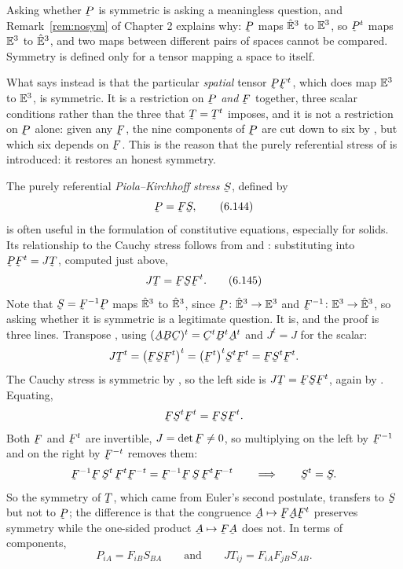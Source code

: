 \begin{remark}\label{rem:ch6Pnotsym}
Asking whether $\bP$ is symmetric is asking a meaningless question, and
Remark~\ref{rem:nosym} of Chapter 2 explains why: $\bP$ maps $\hat{\mathbb{E}}^{3}$ to
$\mathbb{E}^{3}$, so $\bP^{t}$ maps $\mathbb{E}^{3}$ to $\hat{\mathbb{E}}^{3}$, and two maps between
different pairs of spaces cannot be compared. Symmetry is defined only
for a tensor mapping a space to itself.

What  says instead is that the particular \emph{spatial}
tensor $\bP\bF^{t}$, which does map $\mathbb{E}^{3}$ to $\mathbb{E}^{3}$, is symmetric. It
is a restriction on $\bP$ \emph{and} $\bF$ together, three scalar
conditions rather than the three that $\bT=\bT^{t}$ imposes, and it is
not a restriction on $\bP$ alone: given any $\bF$, the nine components
of $\bP$ are cut down to six by , but which six depends on
$\bF$. This is the reason that the purely referential stress of
 is introduced: it restores an honest symmetry.
\end{remark}

The purely referential \emph{Piola--Kirchhoff stress} $\bS$, defined by
\begin{equation}
   \bP=\bF\bS ,
   \tag{6.144}\label{eq:6.144}
\end{equation}
is often useful in the formulation of constitutive equations,
especially for solids. Its relationship to the Cauchy stress follows
from  and : substituting  into
$\bP\bF^{t}=J\bT$, computed just above,
\begin{equation}
   J\bT=\bF\bS\bF^{t}.
   \tag{6.145}\label{eq:6.145}
\end{equation}
Note that $\bS=\bF^{-1}\bP$ maps $\hat{\mathbb{E}}^{3}$ to $\hat{\mathbb{E}}^{3}$, since
$\bP\colon\hVt\to\Vt$ and $\bF^{-1}\colon\Vt\to\hVt$, so asking whether
it is symmetric is a legitimate question. It is, and the proof is three
lines. Transpose , using $(\bA\bB\bC)^{t}
=\bC^{t}\bB^{t}\bA^{t}$ and $J^{t}=J$ for the scalar:
\[
   J\bT^{t}=\big(\bF\bS\bF^{t}\big)^{t}
   =\big(\bF^{t}\big)^{t}\bS^{t}\bF^{t}=\bF\bS^{t}\bF^{t} .
\]
The Cauchy stress is symmetric by , so the left side is
$J\bT=\bF\bS\bF^{t}$, again by . Equating,
\[
   \bF\bS^{t}\bF^{t}=\bF\bS\bF^{t} .
\]
Both $\bF$ and $\bF^{t}$ are invertible, $J=\det\bF\neq0$, so
multiplying on the left by $\bF^{-1}$ and on the right by $\bF^{-t}$
removes them:
\[
   \bF^{-1}\bF\,\bS^{t}\,\bF^{t}\bF^{-t}
   =\bF^{-1}\bF\,\bS\,\bF^{t}\bF^{-t}
   \qquad\Longrightarrow\qquad
   \bS^{t}=\bS .
\]
So the symmetry of $\bT$, which came from Euler's second postulate,
transfers to $\bS$ but not to $\bP$; the difference is that the
congruence $\bA\mapsto\bF\bA\bF^{t}$ preserves symmetry while the
one-sided product $\bA\mapsto\bF\bA$ does not. In terms of
components,
\begin{equation}
   P_{iA}=F_{iB}S_{BA}
   \qquad\text{and}\qquad
   JT_{ij}=F_{iA}F_{jB}S_{AB}.
   \tag{6.146}\label{eq:6.146}
\end{equation}

